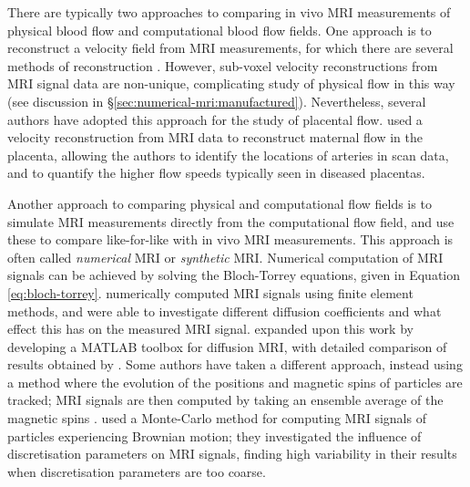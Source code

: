         There are typically two approaches to comparing in vivo MRI measurements of physical blood flow and computational blood flow fields. One approach is to reconstruct a velocity field from MRI measurements, for which there are several methods of reconstruction \cite{benningPhaseReconstructionVelocityencoded2014,wymerPhaseContrastMRIPhysics2020,rutkowskiEnhancementCerebrovascular4D2021}. However, sub-voxel velocity reconstructions from MRI signal data are non-unique, complicating study of physical flow in this way (see discussion in \S\ref{sec:numerical-mri:manufactured}). Nevertheless, several authors have adopted this approach for the study of placental flow. \citeauthor{dellschaftHaemodynamicsHumanPlacenta2020} \cite{dellschaftHaemodynamicsHumanPlacenta2020} used a velocity reconstruction from MRI data to reconstruct maternal flow in the placenta, allowing the authors to identify the locations of arteries in scan data, and to quantify the higher flow speeds typically seen in diseased placentas.

        Another approach to comparing physical and computational flow fields is to simulate MRI measurements directly from the computational flow field, and use these to compare like-for-like with in vivo MRI measurements. This approach is often called \textit{numerical} MRI or \textit{synthetic} MRI. Numerical computation of MRI signals can be achieved by solving the Bloch-Torrey equations, given in Equation \eqref{eq:bloch-torrey}. \citeauthor{nguyenFiniteElementsMethod2014} \cite{nguyenFiniteElementsMethod2014} numerically computed MRI signals using finite element methods, and were able to investigate different diffusion coefficients and what effect this has on the measured MRI signal. \citeauthor{liSpinDoctorMATLABToolbox2019} \cite{liSpinDoctorMATLABToolbox2019} expanded upon this work by developing a MATLAB toolbox for diffusion MRI, with detailed comparison of results obtained by \citeauthor{cookCaminoOpenSourceDiffusionMRI} \cite{cookCaminoOpenSourceDiffusionMRI}. Some authors have taken a different approach, instead using a method where the evolution of the positions and magnetic spins of particles are tracked; MRI signals are then computed by taking an ensemble average of the magnetic spins \cite{hutchinsonInvestigatingPlacentalHaemodynamics2023,rafael-patinoRobustMonteCarloSimulations2020}. \citeauthor{rafael-patinoRobustMonteCarloSimulations2020} \cite{rafael-patinoRobustMonteCarloSimulations2020} used a Monte-Carlo method for computing MRI signals of particles experiencing Brownian motion; they investigated the influence of discretisation parameters on MRI signals, finding high variability in their results when discretisation parameters are too coarse.        
        
